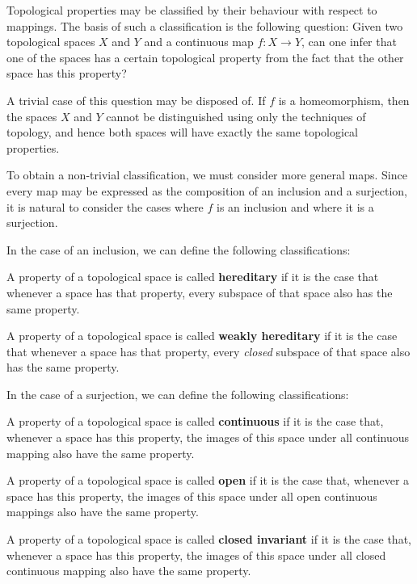 \documentclass[12pt]{article}
\begin{document}
Topological properties may be classified by their behaviour with respect to mappings.  The basis of such a classification is the following question:  Given two topological spaces $X$ and $Y$ and a continuous map $f \colon X \to Y$, can one infer that one of the spaces has a certain topological property from the fact that the other space has this property? 

A trivial case of this question may be disposed of.  If $f$ is a homeomorphism, then the spaces $X$ and $Y$ cannot be distinguished using only the techniques of topology, and hence both spaces will have exactly the same topological properties.

To obtain a non-trivial classification, we must consider more general maps.  Since every map may be expressed as the composition of an inclusion and a surjection, it is natural to consider the cases where $f$ is an inclusion and where it is a surjection.

In the case of an inclusion, we can define the following classifications:

A property of a topological space is called {\bf hereditary} if it is the case that whenever a space has that property, every subspace of that space also has the same property.

A property of a topological space is called {\bf weakly hereditary} if it is the case that whenever a space has that property, every \emph{closed} subspace of that space also has the same property.

In the case of a surjection, we can define the following classifications:

A property of a topological space is called {\bf continuous} if it is the case that, whenever a space has this property, the images of this space under all continuous mapping also have the same property.

A property of a topological space is called {\bf open} if it is the case that, whenever a space has this property, the images of this space under all open continuous mappings also have the same property.

A property of a topological space is called {\bf closed invariant} if it is the case that, whenever a space has this property, the images of this space under all closed continuous mapping also have the same property.
\end{document}
